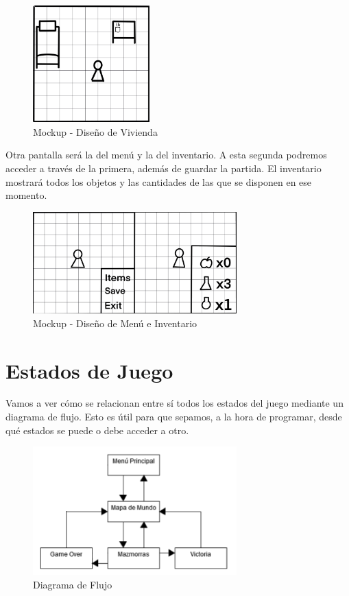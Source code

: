 \begin{figure}[h]
\centering
\includegraphics[width=0.4\textwidth]{include/images/gdd/gdd_house.png}
\caption{Mockup - Diseño de Vivienda}
\label{figure:gddhouse}
\end{figure}

Otra pantalla será la del menú y la del inventario. A esta segunda podremos acceder a través de la primera, además de guardar la partida. El inventario mostrará todos los objetos y las cantidades de las que se disponen en ese momento.

\begin{figure}[h]
\centering
\includegraphics[width=0.7\textwidth]{include/images/gdd/gdd_menu.png}
\caption{Mockup - Diseño de Menú e Inventario}
\label{figure:gddmenuinv}
\end{figure}

\clearpage

\section{Estados de Juego}

Vamos a ver cómo se relacionan entre sí todos los estados del juego mediante un diagrama de flujo. Esto es útil para que sepamos, a la hora de programar, desde qué estados se puede o debe acceder a otro.

\begin{figure}[h]
\centering
\includegraphics[width=0.7\textwidth]{include/images/gdd/flow.png}
\caption{Diagrama de Flujo}
\label{figure:gddflow}
\end{figure}

